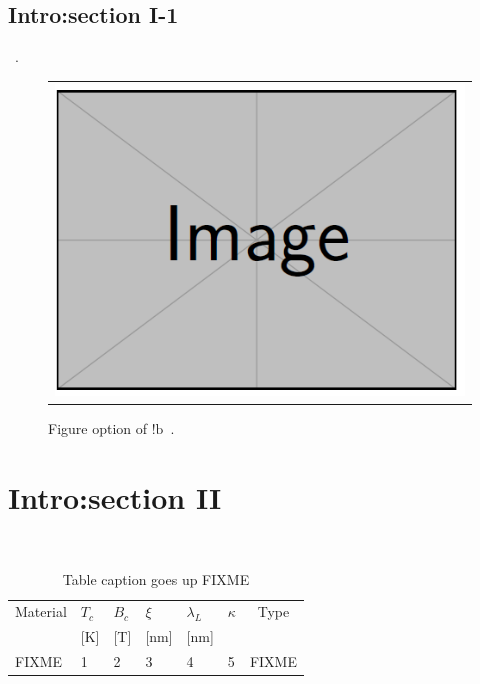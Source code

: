 \subsection{Intro:section I-1}
\lipsum[1-4]~\cite{anderson1964hard}.

\begin{figure}[!b]
	{
	\begin{center}
		\begin{tabular}{c}
			\includegraphics[width=0.9\linewidth]{dummy.png}
		\end{tabular}
	\end{center}
	}
	\caption[dummy image FIXME2 with long long long long long long long title]{Figure option of $!\text{b}$~\cite{Niepce2020geometric}.}
\label{dummy_img2}
\end{figure}

\section{Intro:section II}
\lipsum[1-4]~\cite{anderson1964hard}

\begin{table}[htbp]
	\renewcommand{\arraystretch}{1.6}
	\setlength{\tabcolsep}{10pt}
	\caption{Table caption goes up FIXME}
	\label{tbl2_1}
	\centering
	\begin{tabular}{l l l l l l c}
	\hline\hline
	Material & $T_c$ & $B_c$& $\xi$ & $\lambda_L$ & $\kappa$ & Type \\
	\hfill & [K] & [T] & [nm] & [nm] & \hfill & \hfill \\
	\hline
	FIXME & 1 & 2 & 3 & 4 & 5 & FIXME \\
	\hline\hline
	\end{tabular}
\end{table}

